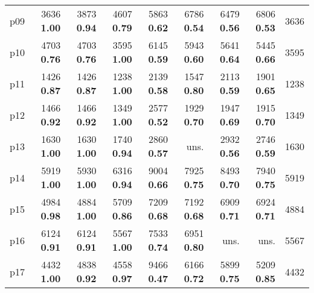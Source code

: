 \begin{tabular}{|l|rrrrrrr|r|}
p09 & {\footnotesize 3636} \textbf{1.00} & {\footnotesize 3873} \textbf{0.94} & {\footnotesize 4607} \textbf{0.79} & {\footnotesize 5863} \textbf{0.62} & {\footnotesize 6786} \textbf{0.54} & {\footnotesize 6479} \textbf{0.56} & {\footnotesize 6806} \textbf{0.53} & 3636\\
p10 & {\footnotesize 4703} \textbf{0.76} & {\footnotesize 4703} \textbf{0.76} & {\footnotesize 3595} \textbf{1.00} & {\footnotesize 6145} \textbf{0.59} & {\footnotesize 5943} \textbf{0.60} & {\footnotesize 5641} \textbf{0.64} & {\footnotesize 5445} \textbf{0.66} & 3595\\
p11 & {\footnotesize 1426} \textbf{0.87} & {\footnotesize 1426} \textbf{0.87} & {\footnotesize 1238} \textbf{1.00} & {\footnotesize 2139} \textbf{0.58} & {\footnotesize 1547} \textbf{0.80} & {\footnotesize 2113} \textbf{0.59} & {\footnotesize 1901} \textbf{0.65} & 1238\\
p12 & {\footnotesize 1466} \textbf{0.92} & {\footnotesize 1466} \textbf{0.92} & {\footnotesize 1349} \textbf{1.00} & {\footnotesize 2577} \textbf{0.52} & {\footnotesize 1929} \textbf{0.70} & {\footnotesize 1947} \textbf{0.69} & {\footnotesize 1915} \textbf{0.70} & 1349\\
p13 & {\footnotesize 1630} \textbf{1.00} & {\footnotesize 1630} \textbf{1.00} & {\footnotesize 1740} \textbf{0.94} & {\footnotesize 2860} \textbf{0.57} & uns. & {\footnotesize 2932} \textbf{0.56} & {\footnotesize 2746} \textbf{0.59} & 1630\\
p14 & {\footnotesize 5919} \textbf{1.00} & {\footnotesize 5930} \textbf{1.00} & {\footnotesize 6316} \textbf{0.94} & {\footnotesize 9004} \textbf{0.66} & {\footnotesize 7925} \textbf{0.75} & {\footnotesize 8493} \textbf{0.70} & {\footnotesize 7940} \textbf{0.75} & 5919\\
p15 & {\footnotesize 4984} \textbf{0.98} & {\footnotesize 4884} \textbf{1.00} & {\footnotesize 5709} \textbf{0.86} & {\footnotesize 7209} \textbf{0.68} & {\footnotesize 7192} \textbf{0.68} & {\footnotesize 6909} \textbf{0.71} & {\footnotesize 6924} \textbf{0.71} & 4884\\
p16 & {\footnotesize 6124} \textbf{0.91} & {\footnotesize 6124} \textbf{0.91} & {\footnotesize 5567} \textbf{1.00} & {\footnotesize 7533} \textbf{0.74} & {\footnotesize 6951} \textbf{0.80} & uns. & uns. & 5567\\
p17 & {\footnotesize 4432} \textbf{1.00} & {\footnotesize 4838} \textbf{0.92} & {\footnotesize 4558} \textbf{0.97} & {\footnotesize 9466} \textbf{0.47} & {\footnotesize 6166} \textbf{0.72} & {\footnotesize 5899} \textbf{0.75} & {\footnotesize 5209} \textbf{0.85} & 4432\\

\end{tabular}
